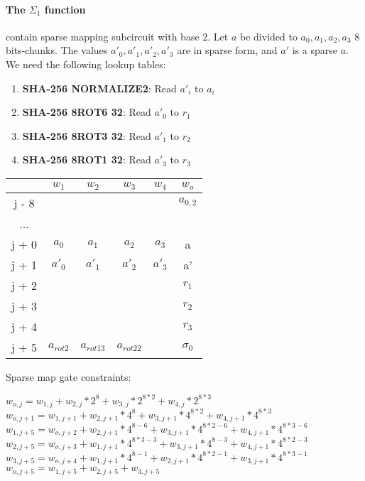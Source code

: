 \paragraph{The $\Sigma_1$ function}
contain sparse mapping subcircuit with base $2$.
Let $a$ be divided to $a_0, a_1, a_2, a_3$ 8 bits-chunks.
The values $a'_0, a'_1, a'_2, a'_3$ are in sparse form, and $a'$ is a sparse $a$.
We need the following lookup tables:
\begin{enumerate}
\item \textbf{SHA-256 NORMALIZE2}: Read $a'_i$ to $a_i$
\item \textbf{SHA-256 8ROT6 32}: Read $a'_0$ to $r_1$
\item \textbf{SHA-256 8ROT3 32}: Read $a'_1$ to $r_2$
\item \textbf{SHA-256 8ROT1 32}: Read $a'_3$ to $r_3$
\end{enumerate}
\begin{center}
\begin{tabular}{ |c|c|c|c|c|c } 
  & $w_1$ & $w_2$ & $w_3$ & $w_4$ & $w_o$\\ 
 \hline
j - 8 &  &  &  &  & $a_{0, 2}$\\ 
... &&&&& \\
j + 0 & $a_0$ & $ a_1$ & $a_2$ & $a_3$ & a\\ 
j + 1 & $a'_0$ & $a'_1$ & $a'_2$ & $a'_3$ & a' \\ 
j + 2 & &  &  &  & $r_1$ \\
j + 3 & &  &  &  & $r_2 $ \\ 
j + 4 & &  &  &  & $r_3 $ \\ 
j + 5 & $a_{rot2} $& $a_{rot13}$ & $a_{rot22}$ &  & $\sigma_0$ \\ 
 \hline
\end{tabular}
\end{center}
Sparse map gate constraints:
\begin{center}
$w_{o,j} = w_{1,j} + w_{2,j}*2^8 + w_{3,j}*2^{8*2} + w_{4,j}*2^{8*3}$ \\
$w_{o,j+1} = w_{1,j+1} + w_{2,j+1}*4^8 + w_{3,j+1}*4^{8*2} + w_{4,j+1}*4^{8*3}$ \\
$w_{1,j+5} = w_{o,j+2} + w_{2,j+1}*4^{8-6} + w_{3,j+1}*4^{8*2-6} + w_{4,j+1}*4^{8*3 - 6}$ \\
$w_{2,j+5} = w_{o,j+3} + w_{1,j+1}*4^{8*3-3} + w_{3,j+1}*4^{8-3} + w_{4,j+1}*4^{8*2 - 3}$ \\
$w_{3,j+5} = w_{o,j+4} + w_{1,j+1}*4^{8-1} + w_{2,j+1}*4^{8*2-1} + w_{3,j+1}*4^{8*3 - 1}$ \\
$w_{o, j+5} = w_{1,j+5} + w_{2, j+5} + w_{3, j+5}$ \\
\end{center}

